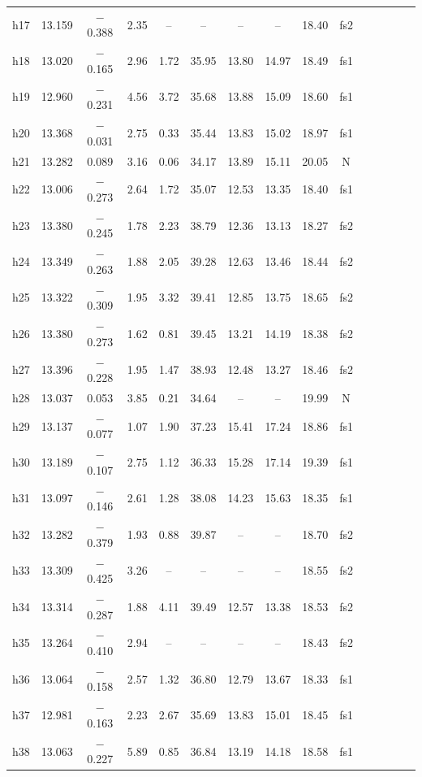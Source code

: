 \documentclass[11pt]{article}
\begin{document}
\begin{table}[htbp]
{\begin{tabular}{lcccccccccccccc}
 h17 &13.159 &  $-$0.388 & 2.35 & --   &  --	 & --    &   -- & 18.40 &fs2  \\
 h18 &13.020 &  $-$0.165 & 2.96 &1.72  & 35.95   & 13.80 & 14.97& 18.49 &fs1  \\
 h19 &12.960 &  $-$0.231 & 4.56 &3.72  & 35.68   & 13.88 & 15.09& 18.60 &fs1  \\
 h20 &13.368 &  $-$0.031 & 2.75 &0.33  & 35.44   & 13.83 & 15.02& 18.97 &fs1  \\
 h21 &13.282 &   0.089   & 3.16 &0.06  & 34.17   & 13.89 & 15.11& 20.05 &N  \\
 h22 &13.006 &  $-$0.273 & 2.64 &1.72  & 35.07   & 12.53 & 13.35& 18.40 &fs1  \\
 h23 &13.380 &  $-$0.245 & 1.78 &2.23  & 38.79   & 12.36 & 13.13& 18.27 &fs2  \\
 h24 &13.349 &  $-$0.263 & 1.88 &2.05  & 39.28   & 12.63 & 13.46& 18.44 &fs2  \\
 h25 &13.322 &  $-$0.309 & 1.95 &3.32  & 39.41   & 12.85 & 13.75& 18.65 &fs2  \\
 h26 &13.380 &  $-$0.273 & 1.62 &0.81  & 39.45   & 13.21 & 14.19& 18.38 &fs2  \\
 h27 &13.396 &  $-$0.228 & 1.95 &1.47  & 38.93   & 12.48 & 13.27& 18.46 &fs2  \\
 h28 &13.037 &   0.053   & 3.85 &0.21  & 34.64   &  --   &   -- & 19.99 &N \\
 h29 &13.137 &  $-$0.077 & 1.07 &1.90  & 37.23   & 15.41 & 17.24& 18.86 &fs1  \\
 h30 &13.189 &  $-$0.107 & 2.75 &1.12  & 36.33   & 15.28 & 17.14& 19.39 &fs1  \\
 h31 &13.097 &  $-$0.146 & 2.61 &1.28  & 38.08   & 14.23 & 15.63& 18.35 &fs1  \\
 h32 &13.282 &  $-$0.379 & 1.93 &0.88  & 39.87   &  --   &   -- & 18.70 &fs2  \\
 h33 &13.309 &  $-$0.425 & 3.26 & --   & --	 &  --   &   -- & 18.55 &fs2  \\
 h34 &13.314 &  $-$0.287 & 1.88 &4.11  & 39.49   & 12.57 & 13.38& 18.53 &fs2  \\
 h35 &13.264 &  $-$0.410 & 2.94 & --   &  --	 & --    &   -- & 18.43 &fs2  \\
 h36 &13.064 &  $-$0.158 & 2.57 &1.32  & 36.80   & 12.79 & 13.67& 18.33 &fs1  \\
 h37 &12.981 &  $-$0.163 & 2.23 &2.67  & 35.69   & 13.83 & 15.01& 18.45 &fs1  \\
 h38 &13.063 &  $-$0.227 & 5.89 &0.85  & 36.84   & 13.19 & 14.18& 18.58 &fs1  \\

\end{tabular}}
\end{table}
\end{document}
